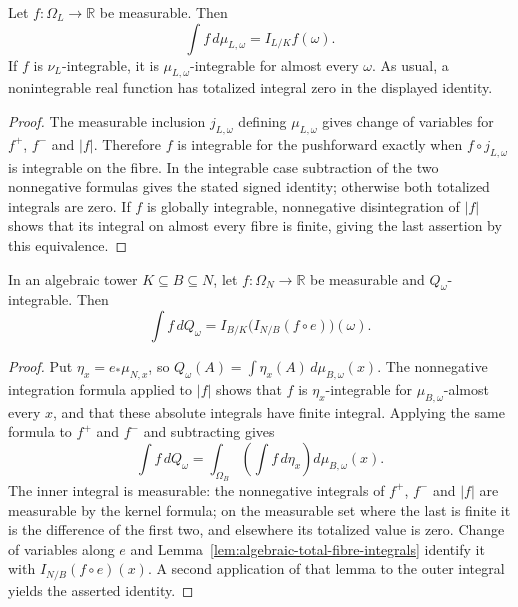 \begin{lemma}
\label{lem:algebraic-total-fibre-integrals}
\leanok
{}
Let $f:\Omega_L\to\mathbb R$ be measurable. Then
\[
 \int f\,d\mu_{L,\omega}=I_{L/K}f(\omega).
\]
If $f$ is $\nu_L$-integrable, it is $\mu_{L,\omega}$-integrable for
almost every $\omega$. As usual, a nonintegrable real function has
totalized integral zero in the displayed identity.
\end{lemma}
\begin{proof}
The measurable inclusion $j_{L,\omega}$ defining $\mu_{L,\omega}$
gives change of variables for $f^+$, $f^-$ and $|f|$. Therefore $f$
is integrable for the pushforward exactly when $f\circ j_{L,\omega}$
is integrable on the fibre. In the integrable case subtraction of the
two nonnegative formulas gives the stated signed identity; otherwise
both totalized integrals are zero. If $f$ is globally integrable,
nonnegative disintegration of $|f|$ shows that its integral on almost
every fibre is finite, giving the last assertion by this equivalence.
\end{proof}

\begin{lemma}
\label{lem:algebraic-tower-probability-integral}
\leanok
{}
In an algebraic tower $K\subseteq B\subseteq N$, let
$f:\Omega_N\to\mathbb R$ be measurable and $Q_\omega$-integrable.
Then
\[
 \int f\,dQ_\omega
 =I_{B/K}\bigl(I_{N/B}(f\circ e)\bigr)(\omega).
\]
\end{lemma}
\begin{proof}
Put $\eta_x=e_*\mu_{N,x}$, so
$Q_\omega(A)=\int\eta_x(A)\,d\mu_{B,\omega}(x)$.
The nonnegative integration formula applied to $|f|$ shows that
$f$ is $\eta_x$-integrable for $\mu_{B,\omega}$-almost every $x$,
and that these absolute integrals have finite integral. Applying the
same formula to $f^+$ and $f^-$ and subtracting gives
\[
 \int f\,dQ_\omega
 =\int_{\Omega_B}\left(\int f\,d\eta_x\right)d\mu_{B,\omega}(x).
\]
The inner integral is measurable: the nonnegative integrals of
$f^+$, $f^-$ and $|f|$ are measurable by the kernel formula; on the
measurable set where the last is finite it is the difference of the
first two, and elsewhere its totalized value is zero. Change of
variables along $e$ and Lemma~\ref{lem:algebraic-total-fibre-integrals}
identify it with $I_{N/B}(f\circ e)(x)$. A second application of
that lemma to the outer integral yields the asserted identity.
\end{proof}

